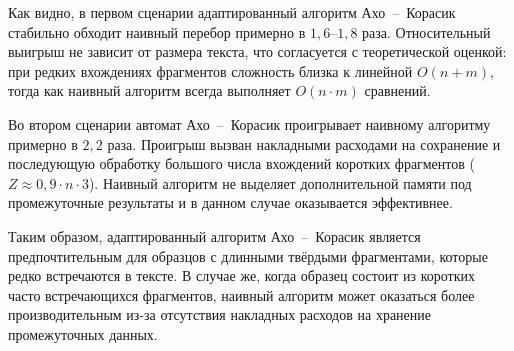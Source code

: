 Как видно, в первом сценарии адаптированный алгоритм Ахо~--~Корасик
стабильно обходит наивный перебор примерно в $1{,}6$--$1{,}8$ раза.
Относительный выигрыш не зависит от размера текста, что согласуется
с теоретической оценкой: при редких вхождениях фрагментов сложность
близка к линейной $O(n + m)$, тогда как наивный алгоритм всегда
выполняет $O(n \cdot m)$ сравнений.

Во втором сценарии автомат Ахо~--~Корасик проигрывает наивному
алгоритму примерно в $2{,}2$ раза. Проигрыш вызван накладными
расходами на сохранение и последующую обработку большого числа
вхождений коротких фрагментов ($Z \approx 0{,}9 \cdot n \cdot 3$).
Наивный алгоритм не выделяет дополнительной памяти под
промежуточные результаты и в данном случае оказывается
эффективнее.

Таким образом, адаптированный алгоритм Ахо~--~Корасик является
предпочтительным для образцов с длинными твёрдыми фрагментами,
которые редко встречаются в тексте. В случае же, когда образец
состоит из коротких часто встречающихся фрагментов, наивный
алгоритм может оказаться более производительным из-за отсутствия
накладных расходов на хранение промежуточных данных.
\pagebreak